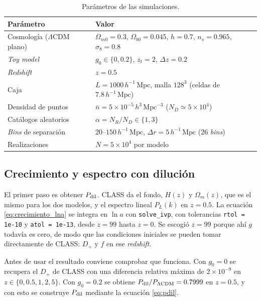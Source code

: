 \documentclass[letterpaper, 12pt]{article}
\newcommand{\hMpc}{\ensuremath{h^{-1}\,\mathrm{Mpc}}}
\newcommand{\LCDM}{\Lambda\mathrm{CDM}}
\begin{document}
        \begin{table}[H]
            \centering
            \caption{Parámetros de las simulaciones.}
            \label{tab:parametros}
            \begin{tabular}{ll}
                \toprule
                Parámetro & Valor \\
                \midrule
                Cosmología ($\LCDM$ plano) & $\Omega_{m0} = 0.3$, $\Omega_{b0} = 0.045$, $h = 0.7$, $n_s = 0.965$, $\sigma_8 = 0.8$ \\
                \emph{Toy model} & $g_0 \in \{0, 0.2\}$, $z_t = 2$, $\Delta z = 0.2$ \\
                \emph{Redshift} & $z = 0.5$ \\
                Caja & $L = 1000\,\hMpc$, malla $128^3$ (celdas de $7.8\,\hMpc$) \\
                Densidad de puntos & $\bar n = 5\times10^{-5}\,h^3\,\mathrm{Mpc}^{-3}$ ($N_D \simeq 5\times10^4$) \\
                Catálogos aleatorios & $\alpha = N_R/N_D \in \{1, 3\}$ \\
                \emph{Bins} de separación & $20$--$150\,\hMpc$, $\Delta r = 5\,\hMpc$ ($26$ \emph{bins}) \\
                Realizaciones & $N = 5\times10^4$ por modelo \\
                \bottomrule
            \end{tabular}
        \end{table}

        \subsection{Crecimiento y espectro con dilución}

            El primer paso es obtener $P_{\rm dil}$. CLASS da el fondo, $H(z)$ y $\Omega_m(z)$, que es el mismo para los dos modelos, y el espectro lineal $P_L(k)$ en $z = 0.5$. La ecuación \eqref{eq:crecimiento_lna} se integra en $\ln a$ con \texttt{solve\_ivp}, con tolerancias \texttt{rtol = 1e-10} y \texttt{atol = 1e-13}, desde $z = 99$ hasta $z = 0$. Se escogió $z = 99$ porque ahí $g$ todavía es cero, de modo que las condiciones iniciales se pueden tomar directamente de CLASS: $D_+$ y $f$ en ese \emph{redshift}.

            Antes de usar el resultado conviene comprobar que funciona. Con $g_0 = 0$ se recupera el $D_+$ de CLASS con una diferencia relativa máxima de $2\times10^{-9}$ en $z \in \{0, 0.5, 1, 2, 5\}$. Con $g_0 = 0.2$ se obtiene $P_{\rm dil}/P_{\LCDM} = 0.7999$ en $z = 0.5$, y con esto se construye $P_{\rm dil}$ mediante la ecuación \eqref{eq:pdil}.
\end{document}
